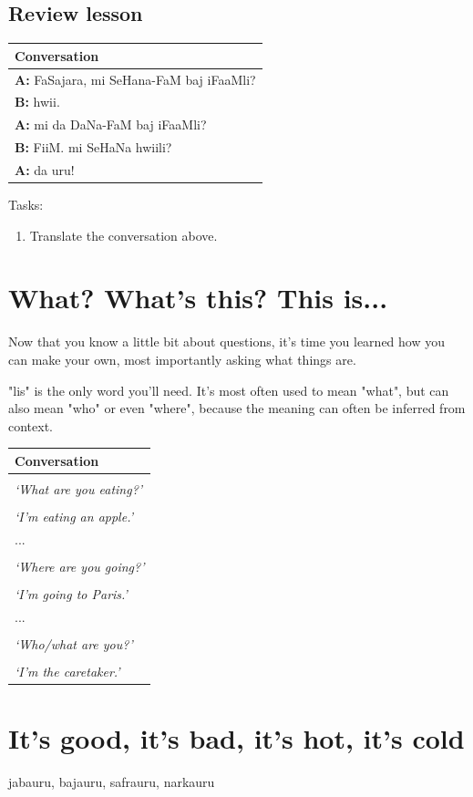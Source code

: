 \documentclass[a5paper,10pt,twoside,openright]{memoir}
\renewcommand{\arraystretch}{1.4}
\newcommand\famword[1]{{\addfontfeatures{Letters=UppercaseSmallCaps}#1}}
\newcommand{\convowidth}{0.862\textwidth}
\newenvironment{conversation}
    {\renewcommand{\arraystretch}{0.75}
    \begin{table}[ht]
        \centering
        \begin{tabular}{p{\convowidth}}
        \toprule
        \textbf{Conversation} \\
        \midrule
    }
    { 
        \bottomrule
        \end{tabular}
    \end{table}
    \renewcommand{\arraystretch}{1.4}
    }
\newcommand{\diaglinetest}[2]{\hspace{1em} 

\begin{minipage}[c][0.5cm][t]{\convowidth}
    \textbf{\uppercase{#1:}} \famword{#2}
\end{minipage} \\}
\newcommand{\diagline}[3]{\hspace{1em} 

\begin{minipage}[c][1cm][t]{\convowidth}
    \textbf{\uppercase{#1:}} \famword{#2} \\
    \textit{`#3'}
\end{minipage} \\}
\begin{document}
\section*{Review lesson}

\begin{conversation}
    \diaglinetest{a}{FaSajara, mi SeHana-FaM baj iFaaMli?}
    \diaglinetest{b}{hwii.}
    \diaglinetest{a}{mi da DaNa-FaM baj iFaaMli?}
    \diaglinetest{b}{FiiM. mi SeHaNa hwiili?}
    \diaglinetest{a}{da uru!}
\end{conversation}

\noindent Tasks:

\begin{enumerate}
    \item Translate the conversation above.
\end{enumerate}

\chapter{What? What's this? This is...}

Now that you know a little bit about questions, it's time you learned how you can make your own, most importantly asking what things are. 

"lis" is the only word you'll need. It's most often used to mean "what", but can also mean "who" or even "where", because the meaning can often be inferred from context.

\begin{conversation}
    \diagline{a}{\famword{mi lis NiiMli?}}{What are you eating?}
    \diagline{b}{\famword{nas PurLi NiiM.}}{I'm eating an apple.}
    \hspace{1.5em}...\\
    \diagline{a}{\famword{mi lis PLiiS?}}{Where are you going?}
    \diagline{b}{\famword{nas PARIS-iPLuSa PLiiS.}}{I'm going to Paris.}
    \hspace{1.5em}...\\
    \diagline{a}{mi lisuruli?}{Who/what are you?}
    \diagline{b}{\famword{nas BanaBuru.}}{I'm the caretaker.}
\end{conversation}

\chapter{It's good, it's bad, it's hot, it's cold}

jabauru, bajauru, safrauru, narkauru
\end{document}
